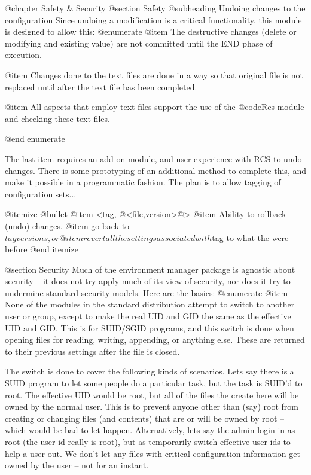 @chapter Safety & Security
@section Safety
@subheading Undoing changes to the configuration
Since undoing a modification is a critical functionality, this module is
designed to allow this:
@enumerate
@item The destructive changes (delete or modifying and existing value) are not
committed until the END phase of execution.

@item Changes done to the text files are done in a way so that original file
is not replaced until after the text file has been completed.

@item All aspects that employ text files support the use of the @code{Rcs}
module and checking these text files.

@end enumerate

The last item requires an add-on module, and user experience with RCS to
undo changes.  There is some prototyping of an additional method to complete
this, and make it possible in a programmatic fashion.  The plan is to allow
tagging of configuration sets...

@itemize @bullet
@item <tag, @{<file,version>@}>
@item Ability to rollback (undo) changes.
@item go back to $tag versions, or
@item revert all the settings associated with $tag to what the were before
@end itemize

@section Security
Much of the environment manager package is agnostic about security -- it does
not try apply much of its view of security, nor does it try to undermine
standard security models.   Here are the basics:
@enumerate
@item None of the modules in the standard distribution attempt to switch
to another user or group, except to make the real UID and GID the same as the
effective UID and GID.  This is for SUID/SGID programs, and this switch is
done when opening files for reading, writing, appending, or anything else.
These are returned to their previous settings after the file is closed.

The switch is done to cover the following kinds of scenarios.  Lets say there
is a SUID program to let some people do a particular task, but the task is
SUID'd to root.  The effective UID would be root, but all of the files the
create here will be owned by the normal user.  This is to prevent anyone
other than (say) root from creating or changing files (and contents) that
are or will be owned by root --  which would be bad to let happen.
Alternatively, lets say the admin login in as root (the user id really is
root),  but as temporarily switch effective user ids to help a user out.
We don't let any files with critical configuration information
get owned by the user -- not for an instant.

